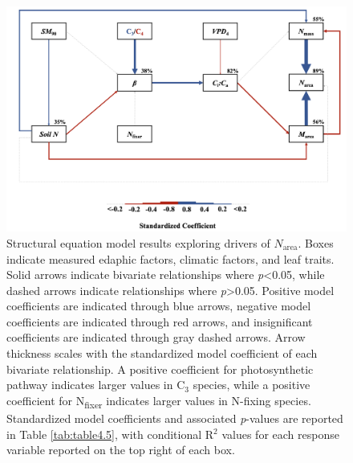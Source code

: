 \newpage
    \begin{figure}
        \centering
        \includegraphics[scale = 0.275]{ch4_TXeco/figs/TXeco_fig5_SEM.png}
        \caption[Structural equation model results exploring drivers of $N_\mathrm{area}$]{Structural equation model results exploring drivers of $N_\mathrm{area}$. Boxes indicate measured edaphic factors, climatic factors, and leaf traits. Solid arrows indicate bivariate relationships where \textit{p}<0.05, while dashed arrows indicate relationships where \textit{p}>0.05. Positive model coefficients are indicated through blue arrows, negative model coefficients are indicated through red arrows, and insignificant coefficients are indicated through gray dashed arrows. Arrow thickness scales with the standardized model coefficient of each bivariate relationship. A positive coefficient for photosynthetic pathway indicates larger values in C$_3$ species, while a positive coefficient for N\textsubscript{fixer} indicates larger values in N-fixing species. Standardized model coefficients and associated \textit{p}-values are reported in Table \ref{tab:table4.5}, with conditional R$^2$ values for each response variable reported on the top right of each box.}
        \label{fig:figure4.5}
    \end{figure}
\clearpage

